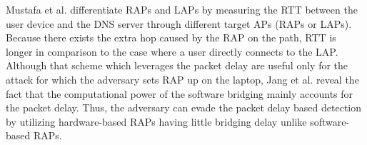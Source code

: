 \documentclass[conference]{IEEEtran}
\begin{document}
Mustafa et al. \cite{rtt} differentiate RAPs and LAPs by measuring the RTT between the user device and the DNS server through different target APs (RAPs or LAPs).
Because there exists the extra hop caused by the RAP on the path, RTT is longer in comparison to the case where a user directly connects to the LAP.
Although that scheme which leverages the packet delay are useful only for the attack for which the adversary sets RAP up on the laptop, Jang et al. \cite{previous} reveal the fact that the computational power of the software bridging mainly accounts for the packet delay.
Thus, the adversary can evade the packet delay based detection by utilizing hardware-based RAPs having little bridging delay unlike software-based RAPs.
\end{document}
